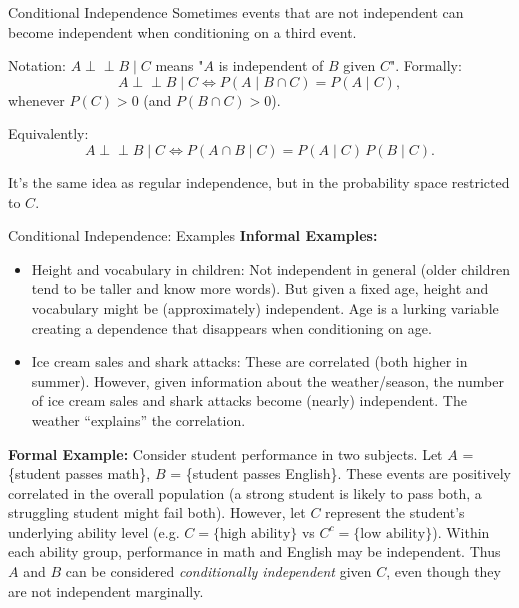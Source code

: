 \documentclass[aspectratio=169,11pt]{beamer} %
\newcommand{\indep}{\perp\!\!\!\perp} %
\begin{document}
\begin{frame}{Conditional Independence}
Sometimes events that are not independent can become independent when conditioning on a third event. \newline

Notation: $A \indep B \mid C$ means "$A$ is independent of $B$ given $C$". Formally:
\[ A \indep B \mid C \iff P(A \mid B \cap C) = P(A \mid C), \]
whenever $P(C)>0$ (and $P(B \cap C)>0$).

Equivalently:
\[ A \indep B \mid C \iff P(A \cap B \mid C) = P(A \mid C)\, P(B \mid C). \]

It's the same idea as regular independence, but in the probability space restricted to $C$.
\end{frame}

\begin{frame}{Conditional Independence: Examples}
\textbf{Informal Examples:}
\begin{itemize}
    \item Height and vocabulary in children: Not independent in general (older children tend to be taller and know more words). But given a fixed age, height and vocabulary might be (approximately) independent. Age is a lurking variable creating a dependence that disappears when conditioning on age.
    \item Ice cream sales and shark attacks: These are correlated (both higher in summer). However, given information about the weather/season, the number of ice cream sales and shark attacks become (nearly) independent. The weather ``explains'' the correlation.
\end{itemize}

\textbf{Formal Example:} 
Consider student performance in two subjects. Let $A$ = \{student passes math\}, $B$ = \{student passes English\}. These events are positively correlated in the overall population (a strong student is likely to pass both, a struggling student might fail both). However, let $C$ represent the student's underlying ability level (e.g. $C=\{\text{high ability}\}$ vs $C^c=\{\text{low ability}\}$). Within each ability group, performance in math and English may be independent. Thus $A$ and $B$ can be considered \emph{conditionally independent} given $C$, even though they are not independent marginally.
\end{frame}
\end{document}

